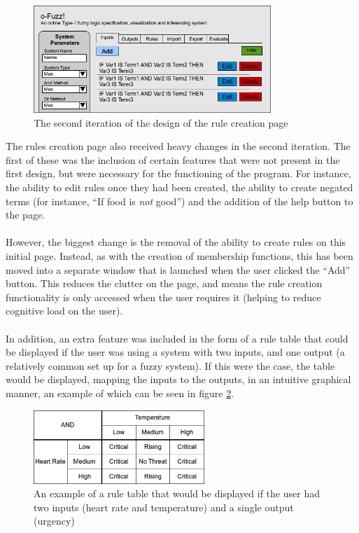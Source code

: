 \begin{figure}[ht!]
\begin{center}
\includegraphics[width=0.8\textwidth]{images/secondItRules}
\end{center}
\caption{The second iteration of the design of the rule creation page}
\label{fig:design-secondIterationRules}
\end{figure}
\noindent 
The rules creation page also received heavy changes in the second iteration. The first of these was the inclusion of certain features that were not present in the first design, but were necessary for the functioning of the program. For instance, the ability to edit rules once they had been created, the ability to create negated terms (for instance, ``If food is \textit{not} good'') and the addition of the help button to the page.\ \\
\ \\
However, the biggest change is the removal of the ability to create rules on this initial page. Instead, as with the creation of membership functions, this has been moved into a separate window that is launched when the user clicked the ``Add'' button. This reduces the clutter on the page, and means the rule creation functionality is only accessed when the user requires it (helping to reduce cognitive load on the user).\ \\
\ \\
In addition, an extra feature was included in the form of a rule table that could be displayed if the user was using a system with two inputs, and one output (a relatively common set up for a fuzzy system). If this were the case, the table would be displayed, mapping the inputs to the outputs, in an intuitive graphical manner, an example of which can be seen in figure \ref{fig:ruleTable}.

\begin{figure}[ht!]
\begin{center}
\includegraphics[width=0.575\textwidth]{images/ruletable}
\end{center}
\vspace{-4mm}
\caption{An example of a rule table that would be displayed if the user had two inputs (heart rate and temperature) and a single output (urgency)}
\label{fig:ruleTable}
\end{figure}

